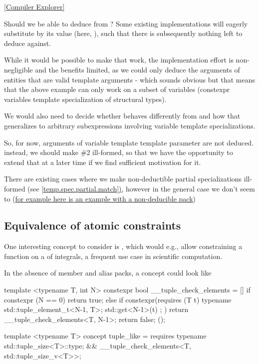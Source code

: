 \documentclass{wg21}
\begin{document}
\href{https://godbolt.org/z/sqTfEojh4}{[Compiler Explorer]}


Should we be able to deduce  from ?
Some existing implementations will eagerly substitute  by its value (here, ),
such that there is subsequently nothing left to deduce  against.

While it would be possible to make that work, the implementation effort is non-negligible and the benefits limited,
as we could only deduce the arguments of entities that are valid template arguments - which sounds obvious but that means that the
above example can only work on a subset of variables (constexpr variables template specialization of structural types).

We would also need to decide whether  behaves differently from 
and how that generalizes to arbitrary subexpressions involving variable template specializations.

So, for now, arguments of variable template template parameter are not deduced.
instead, we should make \#2 ill-formed, so that we have the opportunity to extend that at a later time if we find sufficient motivation for it.

There are existing cases where we make non-deductible partial specializations ill-formed (see \href{https://eel.is/c++draft/temp.spec.partial#match-3}{[temp.spec.partial.match])},
however in the general case we don't seem to (\href{https://gcc.godbolt.org/z/fv1e8nnsf}{for example here is an example with a non-deducible pack})


\subsection{Equivalence of atomic constraints}

One interesting concept to consider is , which would e.g., allow constraining a function on a 
of integrals, a frequent use case in scientific computation.

In the absence of member and alias packs, a  concept could look like

\begin{colorblock}
template <typename T, int N>
constexpr bool __tuple_check_elements = [] {
    if constexpr (N == 0)
      return true;
    else if constexpr(requires (T t) {
        typename std::tuple_element_t<N-1, T>;
        { std::get<N-1>(t) };
    })
      return  __tuple_check_elements<T, N-1>;
    return false;
}();

template <typename T>
concept tuple_like = requires {
    typename std::tuple_size<T>::type;
} &&  __tuple_check_elements<T, std::tuple_size_v<T>>;
\end{colorblock}
\end{document}
